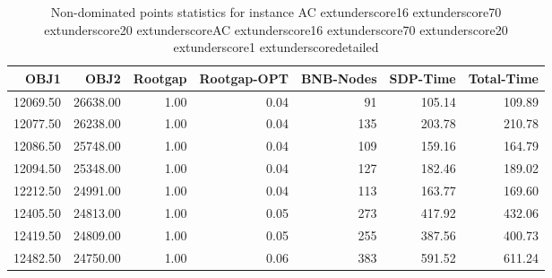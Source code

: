 \begin{table}
\caption{Non-dominated points statistics for instance AC	extunderscore16	extunderscore70	extunderscore20	extunderscoreAC	extunderscore16	extunderscore70	extunderscore20	extunderscore1	extunderscoredetailed}
\label{tab:stats/AC_16_70_20_AC_16_70_20_1_detailed}
\begin{tabular}{rrrrrrr}
\toprule
OBJ1 & OBJ2 & Rootgap & Rootgap-OPT & BNB-Nodes & SDP-Time & Total-Time \\
\midrule
12069.50 & 26638.00 & 1.00 & 0.04 & 91 & 105.14 & 109.89 \\
12077.50 & 26238.00 & 1.00 & 0.04 & 135 & 203.78 & 210.78 \\
12086.50 & 25748.00 & 1.00 & 0.04 & 109 & 159.16 & 164.79 \\
12094.50 & 25348.00 & 1.00 & 0.04 & 127 & 182.46 & 189.02 \\
12212.50 & 24991.00 & 1.00 & 0.04 & 113 & 163.77 & 169.60 \\
12405.50 & 24813.00 & 1.00 & 0.05 & 273 & 417.92 & 432.06 \\
12419.50 & 24809.00 & 1.00 & 0.05 & 255 & 387.56 & 400.73 \\
12482.50 & 24750.00 & 1.00 & 0.06 & 383 & 591.52 & 611.24 \\
\bottomrule
\end{tabular}
\end{table}
